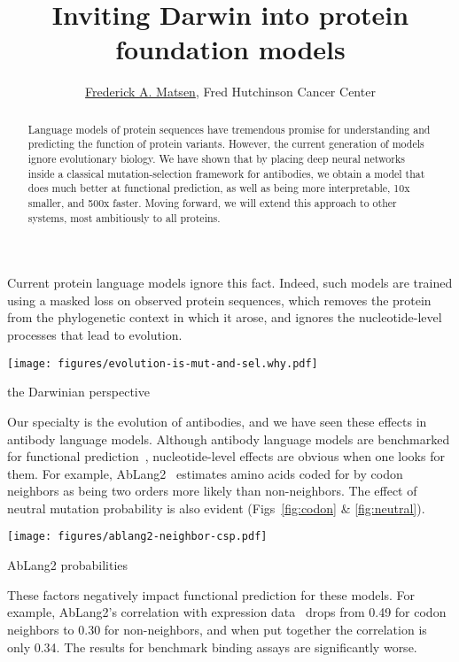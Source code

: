 \documentclass[nobib]{tufte-handout}
\title{Inviting Darwin into protein foundation models}
\author{\href{http://matsen.fredhutch.org/}{Frederick A. Matsen}, Fred Hutchinson Cancer Center}
\begin{document}
\maketitle

\begin{abstract}
\noindent
Language models of protein sequences have tremendous promise for understanding and predicting the function of protein variants.
However, the current generation of models ignore evolutionary biology.
We have shown that by placing deep neural networks inside a classical mutation-selection framework for antibodies, we obtain a model that does much better at functional prediction, as well as being more interpretable, 10x smaller, and 500x faster.
Moving forward, we will extend this approach to other systems, most ambitiously to all proteins.
\end{abstract}

Current protein language models ignore this fact.
Indeed, such models are trained using a masked loss on observed protein sequences, which removes the protein from the phylogenetic context in which it arose, and ignores the nucleotide-level processes that lead to evolution.

\begin{marginfigure}[-9.9cm]%
  \hspace{-19pt}
  \texttt{[image: figures/evolution-is-mut-and-sel.why.pdf]}%
  \caption{the Darwinian perspective}
  \label{fig:darwin}
\end{marginfigure}

Our specialty is the evolution of antibodies, and we have seen these effects in antibody language models.
Although antibody language models are benchmarked for functional prediction~\cite{Chungyoun2024-fc}, nucleotide-level effects are obvious when one looks for them.
For example, AbLang2~\cite{Olsen2024-ablang2} estimates amino acids coded for by codon neighbors as being two orders more likely than non-neighbors.
The effect of neutral mutation probability is also evident (Figs~\ref{fig:codon} \& \ref{fig:neutral}).

\begin{marginfigure}[-7.8cm]%
  \hspace{-19pt}
  \texttt{[image: figures/ablang2-neighbor-csp.pdf]}%
  \caption{AbLang2 probabilities}
  \label{fig:codon}
\end{marginfigure}

These factors negatively impact functional prediction for these models.
For example, AbLang2's correlation with expression data~\cite{Koenig2017-vm} drops from 0.49 for codon neighbors to 0.30 for non-neighbors, and when put together the correlation is only 0.34.
The results for benchmark binding assays are significantly worse.
\end{document}
